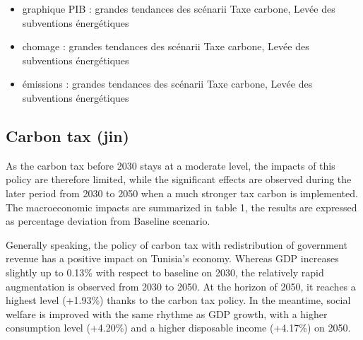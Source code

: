 \documentclass[
]{article}
\providecommand{\tightlist}{%
  \setlength{\itemsep}{0pt}\setlength{\parskip}{0pt}}
\begin{document}
\begin{itemize}
\tightlist
\item
  graphique PIB : grandes tendances des scénarii Taxe carbone, Levée des
  subventions énergétiques
\item
  chomage : grandes tendances des scénarii Taxe carbone, Levée des
  subventions énergétiques
\item
  émissions : grandes tendances des scénarii Taxe carbone, Levée des
  subventions énergétiques
\end{itemize}

\hypertarget{carbon-tax-jin-1}{%
\subsection{Carbon tax (jin)}\label{carbon-tax-jin-1}}

As the carbon tax before 2030 stays at a moderate level, the impacts of
this policy are therefore limited, while the significant effects are
observed during the later period from 2030 to 2050 when a much stronger
tax carbon is implemented. The macroeconomic impacts are summarized in
table 1, the results are expressed as percentage deviation from Baseline
scenario.

Generally speaking, the policy of carbon tax with redistribution of
government revenue has a positive impact on Tunisia's economy. Whereas
GDP increases slightly up to 0.13\% with respect to baseline on 2030,
the relatively rapid augmentation is observed from 2030 to 2050. At the
horizon of 2050, it reaches a highest level (+1.93\%) thanks to the
carbon tax policy. In the meantime, social welfare is improved with the
same rhythme as GDP growth, with a higher consumption level (+4.20\%)
and a higher disposable income (+4.17\%) on 2050.
\end{document}
